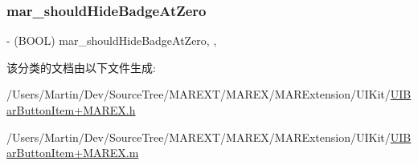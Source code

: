 \subsubsection{\texorpdfstring{mar\+\_\+should\+Hide\+Badge\+At\+Zero}{mar\_shouldHideBadgeAtZero}}
{\footnotesize\ttfamily -\/ (B\+O\+OL) mar\+\_\+should\+Hide\+Badge\+At\+Zero\hspace{0.3cm}{\ttfamily [read]}, {\ttfamily [write]}, {\ttfamily [atomic]}}



该分类的文档由以下文件生成\+:\begin{DoxyCompactItemize}
\item 
/\+Users/\+Martin/\+Dev/\+Source\+Tree/\+M\+A\+R\+E\+X\+T/\+M\+A\+R\+E\+X/\+M\+A\+R\+Extension/\+U\+I\+Kit/\hyperlink{_u_i_bar_button_item_09_m_a_r_e_x_8h}{U\+I\+Bar\+Button\+Item+\+M\+A\+R\+E\+X.\+h}\item 
/\+Users/\+Martin/\+Dev/\+Source\+Tree/\+M\+A\+R\+E\+X\+T/\+M\+A\+R\+E\+X/\+M\+A\+R\+Extension/\+U\+I\+Kit/\hyperlink{_u_i_bar_button_item_09_m_a_r_e_x_8m}{U\+I\+Bar\+Button\+Item+\+M\+A\+R\+E\+X.\+m}\end{DoxyCompactItemize}

